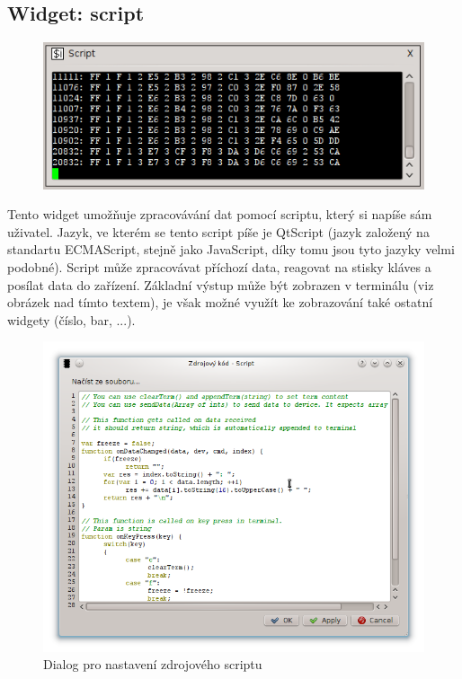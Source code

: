 \documentclass[12pt, a4paper, oneside]{article}
\begin{document}

\newpage
\subsection*{Widget: script}
\begin{figure}[h]
\begin{center}
\includegraphics[scale=0.8]{img/w_script.png}
\end{center}
\end{figure}
Tento widget umožňuje zpracovávání dat pomocí scriptu, který si napíše sám uživatel. Jazyk, ve kterém se tento script píše je QtScript\cite{qtscript} (jazyk založený na standartu ECMAScript\cite{ecmascript}, stejně jako JavaScript\cite{javascript}, díky tomu jsou tyto jazyky velmi podobné). Script může zpracovávat příchozí data, reagovat na stisky kláves a posílat data do zařízení. Základní výstup může být zobrazen v terminálu (viz obrázek nad tímto textem), je však možné využít ke zobrazování také ostatní widgety (číslo, bar, ...).
\begin{figure}[h]
\begin{center}
\includegraphics[scale=0.5]{img/w_script_src.png}
\caption{Dialog pro nastavení zdrojového scriptu}
\end{center}
\end{figure}
\end{document}
